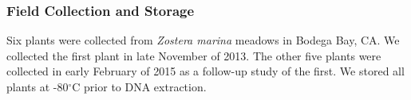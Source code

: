 
\subsubsection{\textbf{Field Collection and Storage}}

    Six plants were collected from \textit{Zostera marina} meadows in Bodega Bay, CA. We collected the first plant in late November of 2013. The other five plants were collected in early February of 2015 as a follow-up study of the first. We stored all plants at -80$^{\circ}$C prior to DNA extraction. 
    
    
    
    